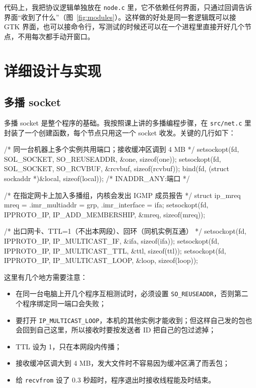 \documentclass[a4paper,zihao=-4]{ctexart}
\newcommand{\inl}[1]{\texttt{#1}}
\begin{document}
代码上，我把协议逻辑单独放在 \inl{node.c} 里，它不依赖任何界面，只通过回调告诉界面“收到了什么”（图~\ref{fig:modules}）。这样做的好处是同一套逻辑既可以接 GTK 界面，也可以接命令行，写测试的时候还可以在一个进程里直接开好几个节点，不用每次都手动开窗口。

\section{详细设计与实现}

\subsection{多播 socket}

多播 socket 是整个程序的基础。我按照课上讲的多播编程步骤，在 \inl{src/net.c} 里封装了一个创建函数，每个节点只用这一个 socket 收发。关键的几行如下：

\begin{code}
/* 同一台机器上多个实例共用端口；接收缓冲区调到 4 MB */
setsockopt(fd, SOL_SOCKET, SO_REUSEADDR, &one, sizeof(one));
setsockopt(fd, SOL_SOCKET, SO_RCVBUF, &rcvbuf, sizeof(rcvbuf));
bind(fd, (struct sockaddr *)&local, sizeof(local));     /* INADDR_ANY:端口 */

/* 在指定网卡上加入多播组，内核会发出 IGMP 成员报告 */
struct ip_mreq mreq = {.imr_multiaddr = grp, .imr_interface = ifa};
setsockopt(fd, IPPROTO_IP, IP_ADD_MEMBERSHIP, &mreq, sizeof(mreq));

/* 出口网卡、TTL=1（不出本网段）、回环（同机实例互通） */
setsockopt(fd, IPPROTO_IP, IP_MULTICAST_IF, &ifa, sizeof(ifa));
setsockopt(fd, IPPROTO_IP, IP_MULTICAST_TTL, &ttl, sizeof(ttl));
setsockopt(fd, IPPROTO_IP, IP_MULTICAST_LOOP, &loop, sizeof(loop));
\end{code}

这里有几个地方需要注意：

\begin{itemize}
  \item 在同一台电脑上开几个程序互相测试时，必须设置 \inl{SO\_REUSEADDR}，否则第二个程序绑定同一端口会失败；
  \item 要打开 \inl{IP\_MULTICAST\_LOOP}，本机的其他实例才能收到；但这样自己发的包也会回到自己这里，所以接收时要按发送者 ID 把自己的包过滤掉；
  \item TTL 设为 1，只在本网段内传播；
  \item 接收缓冲区调大到 4 MB，发大文件时不容易因为缓冲区满了而丢包；
  \item 给 \inl{recvfrom} 设了 0.3 秒超时，程序退出时接收线程能及时结束。
\end{itemize}
\end{document}
